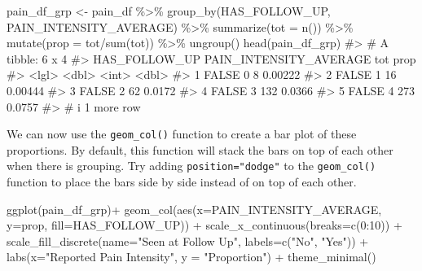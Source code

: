 \documentclass[
  letterpaper,
]{krantz}
\makeatletter
\newenvironment{Shaded}{\begin{snugshade}}{\end{snugshade}}
\newcommand{\AttributeTok}[1]{\textcolor[rgb]{0.40,0.45,0.13}{#1}}
\newcommand{\CommentTok}[1]{\textcolor[rgb]{0.37,0.37,0.37}{#1}}
\newcommand{\DecValTok}[1]{\textcolor[rgb]{0.68,0.00,0.00}{#1}}
\newcommand{\FunctionTok}[1]{\textcolor[rgb]{0.28,0.35,0.67}{#1}}
\newcommand{\NormalTok}[1]{\textcolor[rgb]{0.00,0.23,0.31}{#1}}
\newcommand{\OtherTok}[1]{\textcolor[rgb]{0.00,0.23,0.31}{#1}}
\newcommand{\SpecialCharTok}[1]{\textcolor[rgb]{0.37,0.37,0.37}{#1}}
\newcommand{\StringTok}[1]{\textcolor[rgb]{0.13,0.47,0.30}{#1}}
\newenvironment{kframe}{%
\medskip{}
\setlength{\fboxsep}{.8em}
 \def\at@end@of@kframe{}%
 \ifinner\ifhmode%
  \def\at@end@of@kframe{\end{minipage}}%
  \begin{minipage}{\columnwidth}%
 \fi\fi%
 \def\FrameCommand##1{\hskip\@totalleftmargin \hskip-\fboxsep
 \colorbox{shadecolor}{##1}\hskip-\fboxsep
     \hskip-\linewidth \hskip-\@totalleftmargin \hskip\columnwidth}%
 \MakeFramed {\advance\hsize-\width
   \@totalleftmargin\z@ \linewidth\hsize
   \@setminipage}}%
 {\par\unskip\endMakeFramed%
 \at@end@of@kframe}
\renewenvironment{Shaded}{\begin{kframe}}{\end{kframe}}
\makeatother
\begin{document}
\begin{Shaded}
\begin{Highlighting}[]
\NormalTok{pain\_df\_grp }\OtherTok{\textless{}{-}}\NormalTok{ pain\_df }\SpecialCharTok{\%\textgreater{}\%}
  \FunctionTok{group\_by}\NormalTok{(HAS\_FOLLOW\_UP, PAIN\_INTENSITY\_AVERAGE) }\SpecialCharTok{\%\textgreater{}\%}
  \FunctionTok{summarize}\NormalTok{(}\AttributeTok{tot =} \FunctionTok{n}\NormalTok{()) }\SpecialCharTok{\%\textgreater{}\%}
  \FunctionTok{mutate}\NormalTok{(}\AttributeTok{prop =}\NormalTok{ tot}\SpecialCharTok{/}\FunctionTok{sum}\NormalTok{(tot)) }\SpecialCharTok{\%\textgreater{}\%}
  \FunctionTok{ungroup}\NormalTok{()}
\FunctionTok{head}\NormalTok{(pain\_df\_grp)}
\CommentTok{\#\textgreater{} \# A tibble: 6 x 4}
\CommentTok{\#\textgreater{}   HAS\_FOLLOW\_UP PAIN\_INTENSITY\_AVERAGE   tot    prop}
\CommentTok{\#\textgreater{}   \textless{}lgl\textgreater{}                          \textless{}dbl\textgreater{} \textless{}int\textgreater{}   \textless{}dbl\textgreater{}}
\CommentTok{\#\textgreater{} 1 FALSE                              0     8 0.00222}
\CommentTok{\#\textgreater{} 2 FALSE                              1    16 0.00444}
\CommentTok{\#\textgreater{} 3 FALSE                              2    62 0.0172 }
\CommentTok{\#\textgreater{} 4 FALSE                              3   132 0.0366 }
\CommentTok{\#\textgreater{} 5 FALSE                              4   273 0.0757 }
\CommentTok{\#\textgreater{} \# i 1 more row}
\end{Highlighting}
\end{Shaded}

We can now use the \texttt{geom\_col()} function to create a bar plot of
these proportions. By default, this function will stack the bars on top
of each other when there is grouping. Try adding
\texttt{position="dodge"} to the \texttt{geom\_col()} function to place
the bars side by side instead of on top of each other.

\begin{Shaded}
\begin{Highlighting}[]
\FunctionTok{ggplot}\NormalTok{(pain\_df\_grp)}\SpecialCharTok{+}
  \FunctionTok{geom\_col}\NormalTok{(}\FunctionTok{aes}\NormalTok{(}\AttributeTok{x=}\NormalTok{PAIN\_INTENSITY\_AVERAGE, }\AttributeTok{y=}\NormalTok{prop, }
               \AttributeTok{fill=}\NormalTok{HAS\_FOLLOW\_UP)) }\SpecialCharTok{+}
  \FunctionTok{scale\_x\_continuous}\NormalTok{(}\AttributeTok{breaks=}\FunctionTok{c}\NormalTok{(}\DecValTok{0}\SpecialCharTok{:}\DecValTok{10}\NormalTok{)) }\SpecialCharTok{+} 
  \FunctionTok{scale\_fill\_discrete}\NormalTok{(}\AttributeTok{name=}\StringTok{"Seen at Follow Up"}\NormalTok{, }
                      \AttributeTok{labels=}\FunctionTok{c}\NormalTok{(}\StringTok{"No"}\NormalTok{, }\StringTok{"Yes"}\NormalTok{)) }\SpecialCharTok{+}
  \FunctionTok{labs}\NormalTok{(}\AttributeTok{x=}\StringTok{"Reported Pain Intensity"}\NormalTok{, }\AttributeTok{y =} \StringTok{"Proportion"}\NormalTok{) }\SpecialCharTok{+}
  \FunctionTok{theme\_minimal}\NormalTok{()}
\end{Highlighting}
\end{Shaded}
\end{document}
